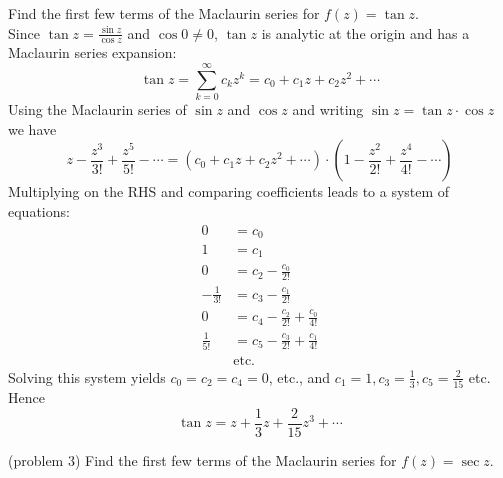 \documentclass[handout]{ximera}
\begin{document}
\begin{example}[example 3]
Find the first few terms of the Maclaurin series for $f(z) = \tan z$.\\
Since $\tan z = \frac{\sin z}{\cos z}$ and $\cos 0 \neq 0$, $\tan z$ is analytic at the origin 
and has a Maclaurin series expansion:
\[
\tan z = \sum_{k=0}^\infty c_k z^k = c_0 + c_1 z + c_2 z^2 + \cdots
\]
Using the Maclaurin series of $\sin z$ and $\cos z$ and writing $\sin z = \tan z \cdot \cos z$ we have
\[
z-\frac{z^3}{3!} + \frac{z^5}{5!} - \cdots = \left(c_0 + c_1 z + c_2 z^2 + \cdots\right) \cdot \left(1-\frac{z^2}{2!} + \frac{z^4}{4!} - \cdots \right)
\]
Multiplying on the RHS and comparing coefficients leads to a system of equations:
\begin{align*}
0 & = c_0 \\
1 & = c_1 \\
0 & = c_2 -\frac{c_0}{2!} \\
-\frac{1}{3!} & =  c_3- \frac{c_1}{2!} \\
0 & = c_4 - \frac{c_2}{2!} +  \frac{c_0}{4!} \\
 \frac{1}{5!} & = c_5- \frac{c_3}{2!} +  \frac{c_1}{4!}\\
 & \text{etc.}
\end{align*}
Solving this system yields $c_0 = c_2 = c_4 = 0$, etc., and  $c_1 = 1, c_3 = \frac13, c_5 = \frac{2}{15}$ etc.
Hence 
\[
\tan z = z + \frac13 z + \frac{2}{15}z^3 + \cdots
\]
\end{example}

\begin{problem}(problem 3)
Find the first few terms of the Maclaurin series for $f(z) = \sec z$.
\end{problem}
\end{document}
